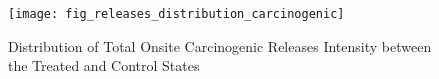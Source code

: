 \begin{figure}[H]
    \centering
    \texttt{[image: fig\_releases\_distribution\_carcinogenic]}
    \caption{Distribution of Total Onsite Carcinogenic Releases Intensity between the Treated and Control States}
    \label{fig:releases-distribution-carcinogenic}
\end{figure}